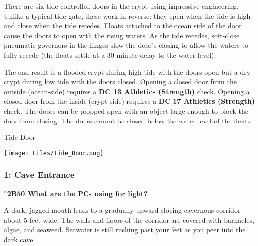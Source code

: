 \documentclass[10pt,twocolumn]{article}
\let\oldtextbf\textbf
\renewcommand{\textbf}[1]{\oldtextbf{{#1}}}
\providecommand{\pandocbounded}[1]{#1}
\renewenvironment{quote}
  {%
    \begingroup
      \setlength{\parindent}{1em}%
      \setlength{\parskip}{0pt}%
      \begin{tcolorbox}[myquote,
        before upper={%
          \let\textbf\oldtextbf
          \setlength{\parindent}{1.5em}%
          \setlength{\parskip}{0pt}%
          \noindent              %
        }%
      ]%
  }
  {%
      \end{tcolorbox}%
    \endgroup
  }
\begin{document}
There are six tide-controlled doors in the crypt using impressive
engineering. Unlike a typical tide gate, these work in reverse: they
open when the tide is high and close when the tide recedes. Floats
attached to the ocean side of the door cause the doors to open with the
rising waters. As the tide recedes, soft-close pneumatic governors in
the hinges slow the door's closing to allow the waters to fully recede
(the floats settle at a 30 minute delay to the water level).

The end result is a flooded crypt during high tide with the doors open
but a dry crypt during low tide with the doors closed. Opening a closed
door from the outside (ocean-side) requires a \textbf{DC 13 Athletics
(Strength)} check. Opening a closed door from the inside (crypt-side)
requires a \textbf{DC 17 Athletics (Strength)} check. The doors can be
propped open with an object large enough to block the door from closing.
The doors cannot be closed below the water level of the floats.

\begin{tcolorbox}[
  colback={imagecolor},
  coltext=black,
  colframe=black,
  boxrule=1pt,
  arc=6pt,
  left=4pt,
  right=4pt,
  top=2pt,
  bottom=2pt,
  boxsep=4pt,
  before skip=10pt,
  after skip=10pt,
  fontupper={\blockquoteFont\small\linespread{0.9}\selectfont\color{black}}
]

\faPhotoVideo\hspace{0.8em}\begin{minipage}[t]{\dimexpr\linewidth-1.8em\hangindent=1.8em\hangafter=0}Tide
Door

\end{minipage}\end{tcolorbox}

\pandocbounded{\texttt{[image: Files/Tide\_Door.png]}}

\subsubsection{1: Cave Entrance}\label{cave-entrance}

\textbf{\textnormal{\emojifont\char"2B50} What are the PCs using for
light?}

\begin{quote}
A dark, jagged mouth leads to a gradually upward sloping cavernous
corridor about 5 feet wide. The walls and floors of the corridor are
covered with barnacles, algae, and seaweed. Seawater is still rushing
past your feet as you peer into the dark cave.
\end{quote}
\end{document}
